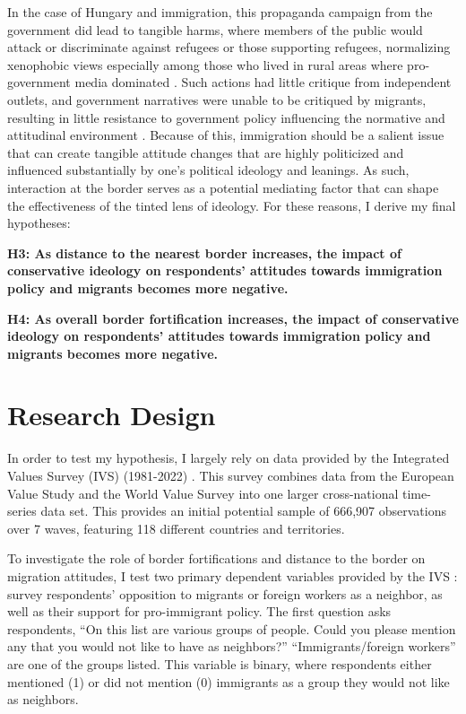 \documentclass[12pt,]{article}
\begin{document}
In the case of Hungary and immigration, this propaganda campaign from
the government did lead to tangible harms, where members of the public
would attack or discriminate against refugees or those supporting
refugees, normalizing xenophobic views especially among those who lived
in rural areas where pro-government media dominated
\citep{bajomi-lazar2019}. Such actions had little critique from
independent outlets, and government narratives were unable to be
critiqued by migrants, resulting in little resistance to government
policy influencing the normative and attitudinal environment
\citep{bajomi-lazar2019}. Because of this, immigration should be a
salient issue that can create tangible attitude changes that are highly
politicized and influenced substantially by one's political ideology and
leanings. As such, interaction at the border serves as a potential
mediating factor that can shape the effectiveness of the tinted lens of
ideology. For these reasons, I derive my final hypotheses:

\textbf{H3: As distance to the nearest border increases, the impact of
conservative ideology on respondents' attitudes towards immigration
policy and migrants becomes more negative.}

\textbf{H4: As overall border fortification increases, the impact of
conservative ideology on respondents' attitudes towards immigration
policy and migrants becomes more negative.}

\section{Research Design}\label{research-design}

In order to test my hypothesis, I largely rely on data provided by the
Integrated Values Survey (IVS) (1981-2022)
\citep{evs2022, hearpfer2024}. This survey combines data from the
European Value Study \citep{evs2022} and the World Value Survey
\citep{harpfer2024} into one larger cross-national time-series data set.
This provides an initial potential sample of 666,907 observations over 7
waves, featuring 118 different countries and territories.

To investigate the role of border fortifications and distance to the
border on migration attitudes, I test two primary dependent variables
provided by the IVS \citep{evs2022, hearpfer2024}: survey respondents'
opposition to migrants or foreign workers as a neighbor, as well as
their support for pro-immigrant policy. The first question asks
respondents, ``On this list are various groups of people. Could you
please mention any that you would not like to have as neighbors?''
``Immigrants/foreign workers'' are one of the groups listed. This
variable is binary, where respondents either mentioned (1) or did not
mention (0) immigrants as a group they would not like as neighbors.
\end{document}
